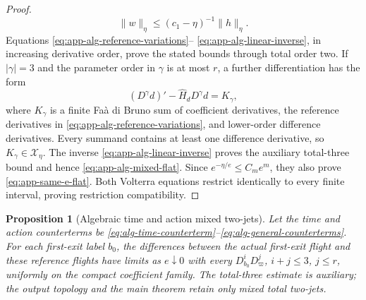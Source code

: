 \documentclass[11pt]{amsart}
\numberwithin{equation}{section}
\newtheorem{proposition}[theorem]{Proposition}
\theoremstyle{definition}
\theoremstyle{remark}
\begin{document}
\begin{proof}
\begin{equation}
 \|w\|_\eta\le(c_1-\eta)^{-1}\|h\|_\eta.
\end{equation}
Equations \eqref{eq:app-alg-reference-variations}--
\eqref{eq:app-alg-linear-inverse}, in increasing derivative order, prove
the stated bounds through total order two.  If $|\gamma|=3$ and the
parameter order in $\gamma$ is at most $r$, a further differentiation has
the form
\begin{equation}\label{eq:app-alg-third-variation}
 (D^\gamma d)'-\widehat H_dD^\gamma d=K_\gamma,
\end{equation}
where $K_\gamma$ is a finite Fa\`a di Bruno sum of coefficient derivatives,
the reference derivatives in
\eqref{eq:app-alg-reference-variations}, and lower-order difference
derivatives.  Every summand contains at least one difference derivative,
so $K_\gamma\in\mathcal X_\eta$.  The inverse
\eqref{eq:app-alg-linear-inverse} proves the auxiliary total-three bound
and hence \eqref{eq:app-alg-mixed-flat}.  Since
$e^{-\eta/e}\le C_me^m$, they also prove
\eqref{eq:app-same-e-flat}.  Both Volterra equations restrict identically
to every finite interval, proving restriction compatibility.
\end{proof}

\begin{proposition}[Algebraic time and action mixed two-jets]
\label{prop:app-alg-limits}
Let the time and action counterterms be
\eqref{eq:alg-time-counterterm}--\eqref{eq:alg-general-counterterms}.
For each first-exit label $b_0$, the differences between the actual
first-exit flight and these reference flights have limits as $e\downarrow0$
with every $D_{b_0}^iD_\varpi^j$, $i+j\le3$, $j\le r$, uniformly on the
compact coefficient family.  The total-three estimate is auxiliary; the
output topology and the main theorem retain only mixed total two-jets.
\end{proposition}
\end{document}
